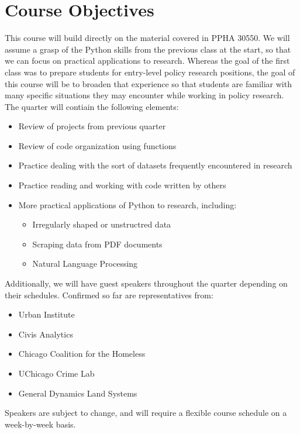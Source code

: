 \documentclass{article}
\begin{document}
\section*{Course Objectives}
This course will build directly on the material covered in PPHA 30550.  We will assume a grasp of the Python skills from the previous class at the start, so that we can focus on practical applications to research.  Whereas the goal of the first class was to prepare students for entry-level policy research positions, the goal of this course will be to broaden that experience so that students are familiar with many specific situations they may encounter while working in policy research.  The quarter will contiain the following elements:

\begin{itemize}
	\item Review of projects from previous quarter
	\item Review of code organization using functions
	\item Practice dealing with the sort of datasets frequently encountered in research
	\item Practice reading and working with code written by others
	\item More practical applications of Python to research, including:
	\begin{itemize}
		\item Irregularly shaped or unstructred data
		\item Scraping data from PDF documents
		\item Natural Language Processing
	\end{itemize}
\end{itemize}

\noindent Additionally, we will have guest speakers throughout the quarter depending on their schedules.  Confirmed so far are representatives from:

\begin{itemize}
	\item Urban Institute
	\item Civis Analytics
	\item Chicago Coalition for the Homeless
	\item UChicago Crime Lab
	\item General Dynamics Land Systems
\end{itemize}

\noindent Speakers are subject to change, and will require a flexible course schedule on a week-by-week basis.
\end{document}
